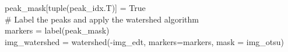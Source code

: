 \documentclass[9pt, aspectratio=169]{beamer}
\begin{document}
\begin{frame}
\begin{columns}
\begin{column}{.7\textwidth}
{\begin{codebox}
{                        peak\_mask[tuple(peak\_idx.T)] = True\\
                        \pause
                        \# Label the peaks and apply the watershed algorithm\\
                        markers = label(peak\_mask)\\
                        img\_watershed = watershed(-img\_edt, markers=markers, mask = img\_otsu)
                    }
                \end{codebox}
            }
        \end{column}
        \begin{column}{.3\textwidth}


\end{column}
\end{columns}
\end{frame}
\end{document}
